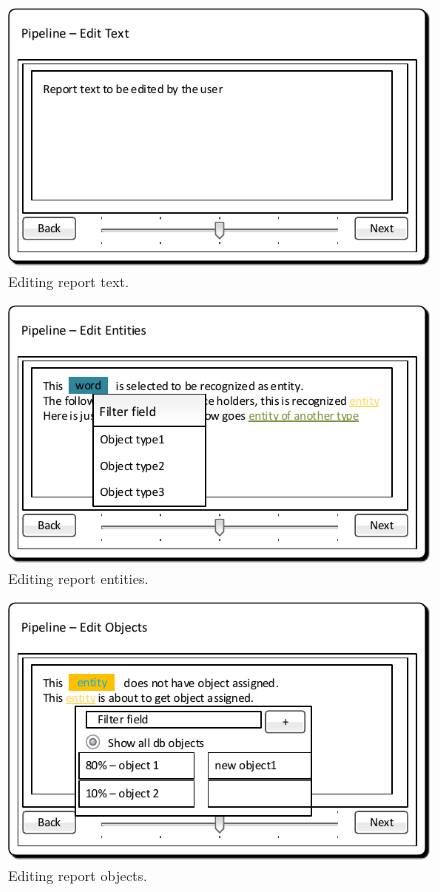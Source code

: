 \begin{figure}[!htb]
        \centering
        \includegraphics{Images/MockupPipelineText}
        \caption{Editing report text.}
        \label{fig:MockupPipelineText}
\end{figure}

\begin{figure}[!htb]
        \centering
        \includegraphics{Images/MockupPipelineEntities}
        \caption{Editing report entities.}
        \label{fig:MockupPipelineEntities}
\end{figure}

\begin{figure}[!htb]
        \centering
        \includegraphics{Images/MockupPipelineObjects}
        \caption{Editing report objects.}
        \label{fig:MockupPipelineObjects}
\end{figure}

